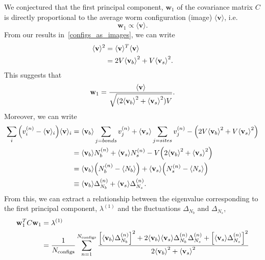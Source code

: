 \documentclass[../main.tex]{subfiles}
\begin{document}
We conjectured that the first principal component, $\mathbf{w}_1$ of the
covariance matrix $C$ is directly proportional to the average worm
configuration (image) $\langle \mathbf{v} \rangle$, i.e.
%
\begin{equation}
    \mathbf{w}_1 \propto \langle \mathbf{v}\rangle.
    \label{conjecture}
\end{equation}
%
From our results in~\ref{configs_as_images}, we can write
%
\begin{align}
    \langle \mathbf{v}\rangle^2
    &= \langle \mathbf{v}\rangle^{T} \langle \mathbf{v}\rangle \\
    &= 2V{\langle \mathbf{v}_b\rangle}^2 + V {\langle \mathbf{v}_s\rangle}^2.
\end{align}
%
This suggests that
%
\begin{equation}
    \mathbf{w}_1 = \frac{\langle \mathbf{v}\rangle}{\sqrt{(2{\langle \mathbf{v}_b\rangle}^2 +
    {\langle \mathbf{v}_s\rangle}^2)V}}.
\end{equation}
%
Moreover, we can write
%
\begin{align}
  \sum_i {\left(v_{i}^{(n)} - \langle\mathbf{v}\rangle_i \right)}
    \langle\mathbf{v}\rangle_{i}
       &= {{\langle \mathbf{v}_b\rangle}\sum_{j=bonds}v_{j}^{(n)}
         +{\langle \mathbf{v}_s\rangle}\sum_{j=sites}v_j^{(n)}
         -\left(2V{\langle \mathbf{v}_b\rangle}^2+V {\langle \mathbf{v}_s\rangle}^2\right)}\\
       &= {\langle \mathbf{v}_b\rangle} N_b^{(n)}+{\langle \mathbf{v}_s\rangle} N_{s}^{(n)}
         -V{\left(2{\langle \mathbf{v}_b\rangle}^2+{\langle \mathbf{v}_s\rangle}^2\right)}\\
       &= {\langle \mathbf{v}_b\rangle}{\left(N_b^{(n)}-\langle N_b\rangle\right)}
         +{\langle \mathbf{v}_s\rangle}{\left(N_s^{(n)}-\langle N_s\rangle\right)}\\
       &\equiv {\langle \mathbf{v}_b\rangle} \Delta_{N_b}^{(n)} + {\langle \mathbf{v}_s\rangle} \Delta_{N_s}^{(n)}.
\end{align}
%
From this, we can extract a relationship between the eigenvalue corresponding
to the first principal component, $\lambda^{(1)}$ and the fluctuations
$\Delta_{N_b}$ and $\Delta_{N_s}$,
%
\begin{align*}
    \mathbf{w}_1^{T} C \mathbf{w}_1
        &= \lambda^{(1)}\\
        &= \frac{1}{N_{\mathrm{configs}}}\sum_{n=1}^{N_{\mathrm{configs}}} \frac{%
          {\left[\bondavg \Delta_{N_b}^{(n)}\right]}^2 + 2\bondavg \siteavg \Delta_{N_b}^{(n)} \Delta_{N_s}^{(n)}
        + {\left[\siteavg \Delta_{N_s}^{(n)}\right]}^2 }{2\bondavg^2 + \siteavg^2}
\end{align*}
%
\end{document}
